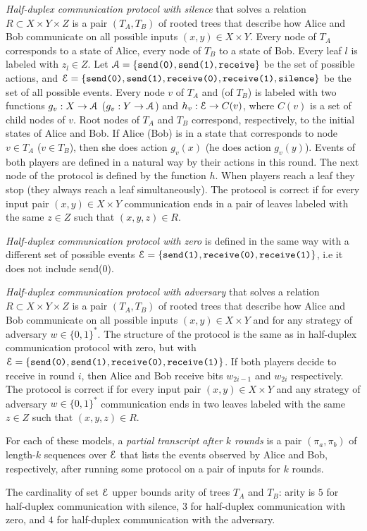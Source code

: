 \begin{definition}\label{ref:hds-protocol}
\emph{Half-duplex communication protocol with silence} that solves a relation $R\subset X\times Y \times Z$ is a pair 
$(T_A, T_B)$ of rooted trees that describe how Alice and Bob communicate
on all possible inputs $(x,y)\in X\times Y$.
Every node of $T_A$ corresponds to a state of Alice, every node of $T_B$ 
to a state of Bob.  Every leaf $l$ is labeled with $z_l\in Z$. 
Let $\mathcal{A} = \{\texttt{send(0)}, \texttt{send(1)}, \texttt{receive}\}$ be the set of possible actions, and $\mathcal{E} = \{\texttt{send(0)}, \texttt{send(1)},
\texttt{receive(0)}, \texttt{receive(1)}, \texttt{silence}\}$ 
be the set of all possible events.  Every node $v$ of $T_A$ and 
(of $T_B$) is labeled with two functions $g_v: X\to \mathcal{A}$ 
($g_v: Y\to \mathcal{A}$) and $h_v: \mathcal{E}\to C(v)$, where $C(v)$ 
is a set of child nodes of $v$.  Root nodes of $T_A$ and
$T_B$ correspond, respectively, to the initial states of Alice and Bob.
If Alice (Bob) is in a state that corresponds to node $v\in T_A$ ($v\in T_B$), 
then she does action $g_v(x)$ (he does action $g_v(y)$). 
Events of both players are defined in a natural way by their actions in this round. The next node of the protocol is defined by the function $h$.
When players reach a leaf they stop (they always reach a leaf simultaneously).  The protocol is correct if for every input pair 
$(x,y)\in X\times Y$ communication ends 
in a pair of leaves labeled with the same 
$z\in Z$ such that $(x,y,z) \in R$.

\emph{Half-duplex communication protocol with zero} is defined in the 
same way with a different set of possible events 
$\mathcal{E} = \{\texttt{send(1)}, \texttt{receive(0)}, \texttt{receive(1)}\}$,
i.e it does not include send(0).

\emph{Half-duplex communication protocol with adversary} 
that solves a relation $R\subset X\times Y \times Z$ is a pair 
$(T_A, T_B)$ of rooted trees that describe how Alice and Bob communicate
on all possible inputs $(x,y)\in X\times Y$ and for any strategy of 
adversary $w\in\{0,1\}^*$. The structure of the protocol is the same
as in half-duplex communication protocol with zero, but with 
$\mathcal{E} = \{\texttt{send(0)}, \texttt{send(1)}, \texttt{receive(0)}, \texttt{receive(1)}\}$. 
If both players decide to receive in round $i$, then Alice and Bob receive
bits $w_{2i-1}$ and $w_{2i}$ respectively.
The protocol is correct if for every input pair 
$(x,y)\in X\times Y$ and any strategy of 
adversary $w\in\{0,1\}^*$ communication ends
in two leaves labeled with the same $z\in Z$ such that $(x,y,z) \in R$.

For each of these models, a \emph{partial transcript after $k$ rounds} is a pair $(\pi_a,\pi_b)$ of length-$k$ sequences over $\mathcal{E}$ that lists the events observed by Alice and Bob, respectively, after running some protocol on a pair of inputs for $k$ rounds.
\end{definition}
The cardinality of set $\mathcal{E}$ upper bounds arity of trees $T_A$ and $T_B$: arity is $5$ for half-duplex communication with silence,
$3$ for half-duplex communication with zero, and $4$ for half-duplex communication with the adversary.

